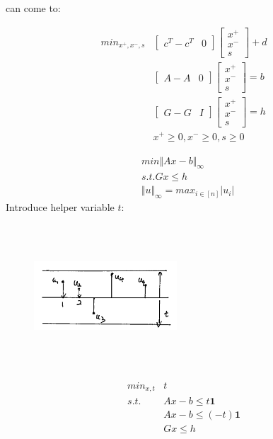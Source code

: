 can come to:

\begin{align*}
min_{x^{+},x^{-},s} &\begin{bmatrix}
c^T - c^T & 0
\end{bmatrix}
\begin{bmatrix}
x^{+}\\
x^{-}\\
s
\end{bmatrix}+d\\
&\begin{bmatrix}
A-A & 0
\end{bmatrix}
\begin{bmatrix}
x^{+}\\
x^{-}\\
s
\end{bmatrix}=b\\
&\begin{bmatrix}
G-G & I
\end{bmatrix}
\begin{bmatrix}
x^{+}\\
x^{-}\\
s
\end{bmatrix}=h\\
&x^{+}\geq 0, x^{-}\geq 0, s\geq 0
\end{align*}




\begin{example}
	\begin{align*}
	&min \Vert Ax - b\Vert_{\infty}\\
	&s.t. Gx \leq h\\
	&\Vert u\Vert_{\infty} = max_{i\in [n]}|u_i|
	\end{align*}
	Introduce helper variable $t$:
	
	\begin{figure}
	\centering
	\includegraphics[width=2.1in,height=2.1in]{figures/ch07/figure1016_2.png}
	\end{figure}
	
	
	\begin{align*}
	min_{x,t} &t\\
	s.t. &Ax - b\leq t\textbf{1}\\
	&Ax - b\leq (-t)\textbf{1}\\
	&Gx \leq h
	\end{align*}
\end{example}


